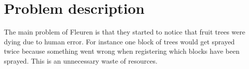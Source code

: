 \section{Problem description}
The main problem of Fleuren is that they started to notice that fruit trees were dying due to human error. For instance  one block of trees would get sprayed twice because something went wrong when registering which blocks have been sprayed. This is an unnecessary waste of resources.